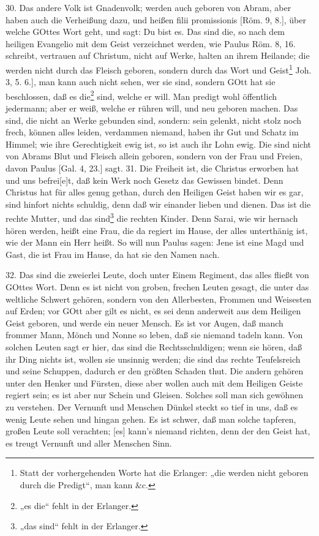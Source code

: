 30. Das andere Volk ist Gnadenvolk; werden auch geboren von Abram, aber haben auch die Verheißung dazu, und heißen filii promissionis [Röm. 9, 8.], über welche GOttes Wort geht, und sagt: Du bist es. Das sind die, so nach dem heiligen Evangelio mit dem Geist verzeichnet
werden, wie Paulus Röm. 8, 16. schreibt, vertrauen auf Christum, nicht auf Werke, halten an ihrem Heilande; die werden nicht durch das Fleisch geboren, sondern durch das Wort und Geist\footnote{Statt der vorhergehenden Worte hat die Erlanger: „die werden nicht geboren durch die Predigt“, man kann \&c.} Joh. 3, 5. 6.], man kann auch nicht sehen, wer sie sind, sondern GOtt hat sie beschlossen, daß es die\footnote{„es die“ fehlt in der Erlanger.} sind, welche er will. Man predigt wohl öffentlich jedermann; aber er weiß, welche er rühren will, und neu geboren machen. Das sind, die nicht an Werke gebunden sind, sondern: sein gelenkt, nicht stolz noch frech, können alles leiden, verdammen niemand, haben ihr Gut und Schatz im Himmel; wie ihre Gerechtigkeit ewig ist, so ist auch ihr Lohn ewig. Die sind nicht von Abrams Blut und Fleisch allein geboren, sondern von der Frau und Freien, davon Paulus [Gal. 4, 23.] sagt. 31. Die Freiheit ist, die Christus erworben hat und uns befrei[e]t, daß kein Werk noch Gesetz das Gewissen bindet. Denn Christus hat für alles genug gethan, durch den Heiligen Geist haben wir es gar, sind hinfort nichts schuldig, denn daß wir einander lieben und dienen. Das ist die rechte Mutter, und das sind\footnote{„das sind“ fehlt in der Erlanger.} die rechten Kinder. Denn Sarai, wie wir hernach hören werden, heißt eine Frau, die da regiert im Hause, der alles unterthänig ist, wie der Mann ein Herr heißt. So will nun Paulus sagen: Jene ist eine Magd und Gast, die ist Frau im Hause, da hat sie den Namen nach.

32. Das sind die zweierlei Leute, doch unter Einem Regiment, das alles fließt von GOttes Wort. Denn es ist nicht von groben, frechen Leuten gesagt, die unter das weltliche Schwert gehören, sondern von den Allerbesten, Frommen und Weisesten auf Erden; vor GOtt aber gilt es nicht, es sei denn anderweit aus dem Heiligen Geist geboren, und werde ein neuer Mensch. Es ist vor Augen, daß manch frommer Mann, Mönch und Nonne so leben, daß sie niemand tadeln kann. Von solchen Leuten sagt er hier, das sind die Rechtsschuldigen; wenn sie hören, daß ihr Ding nichts ist, wollen sie unsinnig werden; die sind das rechte Teufelsreich und seine Schuppen, dadurch er den größten Schaden thut. Die andern gehören unter den Henker und Fürsten, diese aber wollen auch mit dem Heiligen Geiste regiert sein; es ist aber nur Schein und Gleisen. Solches soll man sich gewöhnen zu verstehen. Der Vernunft und Menschen Dünkel steckt so tief in uns, daß es wenig Leute sehen und hingan gehen. Es ist schwer, daß man solche tapferen, großen Leute soll verachten; [es] kann’s niemand richten, denn der den Geist hat, es treugt Vernunft und aller Menschen Sinn.

